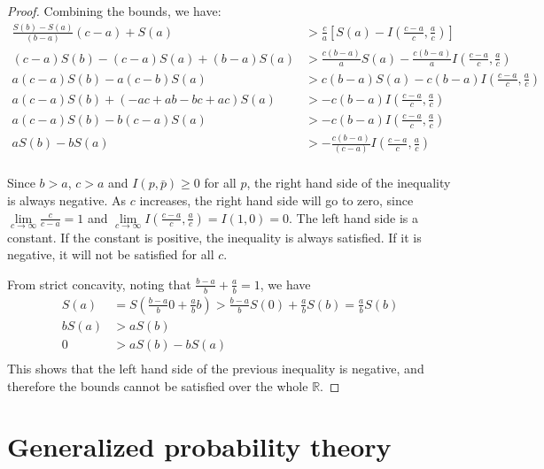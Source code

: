 \begin{proof}
	Combining the bounds, we have:
	\begin{equation}
		\begin{aligned}
			\frac{S(b) - S(a)}{(b-a)} (c-a) + S(a) &> \frac{c}{a} \left[ S(a) - I\left(\frac{c-a}{c}, \frac{a}{c}\right) \right] \\
			(c-a) S(b) - (c-a)S(a) + (b-a) S(a) &> \frac{c(b-a)}{a} S(a) - \frac{c(b-a)}{a} I\left(\frac{c-a}{c}, \frac{a}{c}\right) \\
			a (c-a) S(b) - a(c-b) S(a) &> c(b-a)S(a) - c(b-a) I\left(\frac{c-a}{c}, \frac{a}{c}\right) \\
			a (c-a) S(b) + (-ac +ab -bc +ac) S(a) &> - c(b-a) I\left(\frac{c-a}{c}, \frac{a}{c}\right) \\
			a (c-a) S(b) -b (c-a) S(a) &> - c(b-a) I\left(\frac{c-a}{c}, \frac{a}{c}\right) \\
			a  S(b) - b S(a) &> - \frac{c(b-a)}{(c-a)} I\left(\frac{c-a}{c}, \frac{a}{c}\right) \\
		\end{aligned}
	\end{equation}
	
	Since $b > a$, $c > a$ and $I(p,\bar{p}) \geq 0$ for all $p$, the right hand side of the inequality is always negative. As $c$ increases, the right hand side will go to zero, since $\lim\limits_{c\to \infty}\frac{c}{c-a} = 1$ and $\lim\limits_{c\to \infty} I\left(\frac{c-a}{c}, \frac{a}{c}\right) = I(1,0) = 0$. The left hand side is a constant. If the constant is positive, the inequality is always satisfied. If it is negative, it will not be satisfied for all $c$.
	
	From strict concavity, noting that $\frac{b-a}{b} + \frac{a}{b} = 1$, we have
	\begin{equation}
		\begin{aligned}
			S(a) &= S\left(\frac{b-a}{b} 0 + \frac{a}{b} b\right) > \frac{b-a}{b} S(0) + \frac{a}{b} S(b) = \frac{a}{b} S(b)\\
			b S(a) &> a S(b)  \\
			0 &> a S(b) - b S(a)\\
		\end{aligned}
	\end{equation}
	This shows that the left hand side of the previous inequality is negative, and therefore the bounds cannot be satisfied over the whole $\mathbb{R}$.
\end{proof}


\section{Generalized probability theory}

